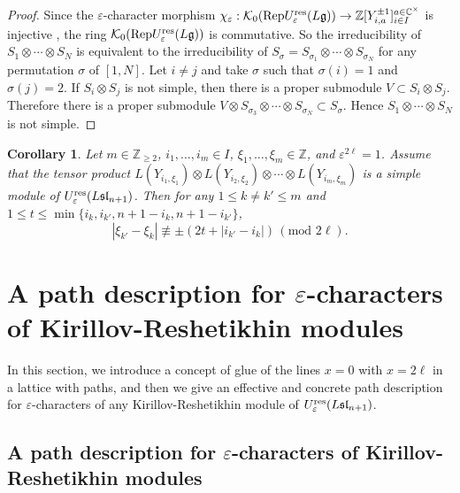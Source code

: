 \documentclass[12pt, reqno]{amsart}
\newtheorem{corollary}[theorem]{Corollary}
\numberwithin{equation}{section}
\newcommand{\res}{{\rm res}}
\begin{document}
{\begin{proof}
Since the $\varepsilon$-character morphism $\chi_{\varepsilon}: \mathcal{K}_0({\rm Rep} U_\varepsilon^{\res}({L\mathfrak{g}})) \rightarrow \mathbb{Z}[Y_{i,a}^{\pm1}]_{i\in I}^{a\in\mathbb{C^{\times}}}$ is injective \cite{FM02}, the ring $\mathcal{K}_0({\rm Rep} U_\varepsilon^{\res}({L\mathfrak{g}}))$ is commutative. So the irreducibility of $S_1 \otimes \cdots \otimes S_N$ is equivalent to the irreducibility of $S_\sigma =S_{\sigma_1}\otimes \cdots \otimes S_{\sigma_N}$ for any permutation $\sigma$ of $[1,N]$. Let $i\neq j$ and take $\sigma$ such that $\sigma(i)=1$ and $\sigma(j)=2$. If $S_i\otimes S_j$ is not simple, then there is a proper submodule $V \subset S_i \otimes S_j$. Therefore there is a proper submodule $V\otimes S_{\sigma_3}\otimes \cdots \otimes S_{\sigma_N}\subset S_\sigma$. Hence $S_1 \otimes \cdots \otimes S_N$ is not simple.
\end{proof}


\begin{corollary}\label{Co:necessary condition for the tensor product}
Let $m\in \mathbb{Z}_{\geq 2}$, $i_{1},\ldots, i_{m}\in I$, $\xi_{1},\ldots, \xi_{m}\in \mathbb{Z}$, and $\varepsilon^{2 \ell}=1$. Assume that the tensor product
$L(Y_{i_1,\xi_1})\otimes L(Y_{i_2,\xi_2})\otimes \cdots \otimes L(Y_{i_m,\xi_m})$ is a simple module of $U_{\varepsilon}^{\res}(L\mathfrak{sl}_{n+1})$.
Then for any $1\leq k\neq k'\leq m$ and $1\leq t\leq \min\{i_k, i_{k'}, n+1-i_k, n+1-i_{k'}\}$,
\[
 | \xi_{k'}-\xi_{k} | \not\equiv \pm(2t+|i_{k'}-i_k|)\,(\text{mod } 2 \ell).
\]
\end{corollary}


\section{\texorpdfstring{A path description for $\varepsilon$-characters of Kirillov-Reshetikhin modules}{A path description for epsilon-characters of Kirillov-Reshetikhin modules}}\label{Kirillov-Reshetikhin}
In this section, we introduce a concept of glue of the lines $x=0$ with $x=2 \ell$ in a lattice with paths, and then we give an effective and concrete path description for $\varepsilon$-characters of any Kirillov-Reshetikhin module of $U_{\varepsilon}^{\res}({L\mathfrak{sl}_{n+1}})$.

\subsection{A path description for $\varepsilon$-characters of Kirillov-Reshetikhin modules}

}
\end{document}
